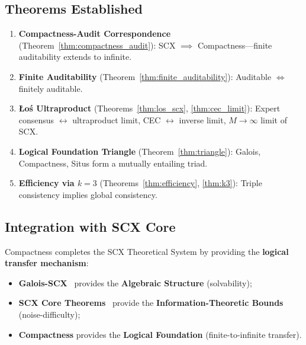 \documentclass[12pt,a4paper]{article}
\theoremstyle{remark}
\begin{document}
\subsection{Theorems Established}
\begin{enumerate}[label=(\arabic*),itemsep=3pt]
    \item \textbf{Compactness-Audit Correspondence} (Theorem~\ref{thm:compactness_audit}): SCX \(\implies\) Compactness---finite auditability extends to infinite.
    \item \textbf{Finite Auditability} (Theorem~\ref{thm:finite_auditability}): Auditable \(\iff\) finitely auditable.
    \item \textbf{Łoś Ultraproduct} (Theorems~\ref{thm:los_scx}, \ref{thm:cec_limit}): Expert consensus \(\leftrightarrow\) ultraproduct limit, CEC \(\leftrightarrow\) inverse limit, \(M \to \infty\) limit of SCX.
    \item \textbf{Logical Foundation Triangle} (Theorem~\ref{thm:triangle}): Galois, Compactness, Situs form a mutually entailing triad.
    \item \textbf{Efficiency via \(k=3\)} (Theorems~\ref{thm:efficiency}, \ref{thm:k3}): Triple consistency implies global consistency.
\end{enumerate}

\subsection{Integration with SCX Core}
Compactness completes the SCX Theoretical System by providing the \textbf{logical transfer mechanism}:
\begin{itemize}[itemsep=3pt]
    \item \textbf{Galois-SCX}~\cite{scx_galois} provides the \textbf{Algebraic Structure} (solvability);
    \item \textbf{SCX Core Theorems}~\cite{scx2026theorems} provide the \textbf{Information-Theoretic Bounds} (noise-difficulty);
    \item \textbf{Compactness} provides the \textbf{Logical Foundation} (finite-to-infinite transfer).
\end{itemize}
\end{document}
